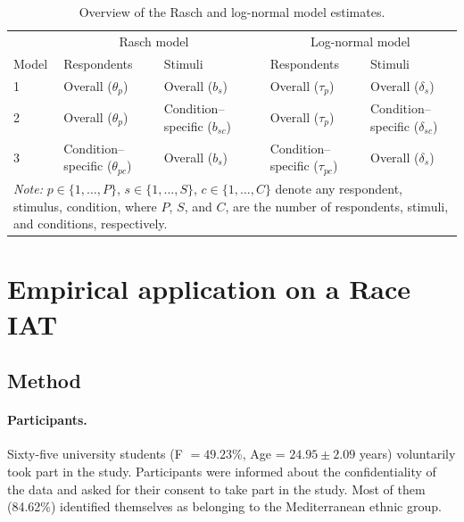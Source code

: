\documentclass[12pt]{book}
\begin{document}
%
\begin{table}[h!]
	\centering\onehalfspacing
	\caption{Overview of the Rasch and log-normal model estimates.}
	\label{tab:paroverview} 
	\begin{tabularx}{\linewidth}{p{1.2cm} p{3cm} p{3cm} p{0.05cm} p{3cm} p{3cm}}
		\toprule
		&\multicolumn{2}{c}{Rasch model}
		& & 
		\multicolumn{2}{c}{Log-normal model}\\ 
		\cline{2-3}\cline{5-6} 
		Model & \multicolumn{1}{l}{Respondents} & \multicolumn{1}{l}{Stimuli} & & \multicolumn{1}{l}{Respondents} & \multicolumn{1}{l}{Stimuli} \\
		\midrule
		1 & Overall ($\theta_p$) & Overall ($b_s$) & & Overall  ($\tau_p$) & Overall ($\delta_s$) \\ 
		
		2 & Overall ($\theta_p$) & Condition--specific ($b_{sc}$) &  & Overall  ($\tau_p$)  & Condition--specific  ($\delta_{sc}$)  \\
		3 & Condition--specific ($\theta_{pc}$) & Overall ($b_s$) & & Condition--specific ($\tau_{pc}$)   & Overall  ($\delta_{s}$) \\
		\bottomrule
		\multicolumn{6}{p{\textwidth}}{\emph{Note:} $p \in \{1, \ldots, P\}$,  $s \in \{1,\ldots, S\}$, $c \in \{1,\ldots, C\}$  denote any respondent, stimulus, condition, where $P$, $S$, and $C$, are the number of respondents, stimuli, and conditions, respectively.}
	\end{tabularx}
\end{table} %

\section[Race IAT]{Empirical application on a Race IAT}\label{sec:rgm}

\subsection{Method}

\paragraph{Participants.}
Sixty-five university students (F $=49.23$\%, Age = $24.95\pm2.09$ years) voluntarily took part in the study. Participants were informed about the confidentiality of the data and asked for their consent to take part in the study. Most of them (84.62\%) identified themselves as belonging to the Mediterranean ethnic group.  
\end{document}
